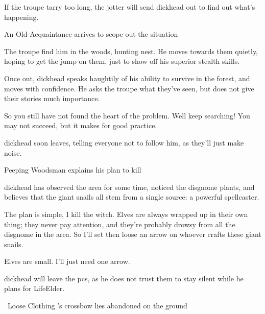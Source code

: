 
If the troupe tarry too long, the \gls{jotter} will send \gls{dickhead} out to find out what's happening.

{An Old Acquaintance}%
{ arrives to scope out the situation}%

The troupe find him in the woods, hunting  nest.
He moves towards them quietly, hoping to get the jump on them, just to show off his superior stealth \glspl{skill}.

Once out, \gls{dickhead} speaks haughtily of his ability to survive in the forest, and moves with confidence.
He asks the troupe what they've seen, but does not give their stories much importance.

\begin{speechtext}
  So you still have not found the heart of the problem.
  Well keep searching!
  You may not succeed, but it makes for good practice.
\end{speechtext}

\Gls{dickhead} soon leaves, telling everyone not to follow him, as they'll just make noise.

\dickhead

{Peeping Woodsman}%
{ explains his plan to kill }%

\Gls{dickhead} has observed the area for some time, noticed the \gls{disgnome} plants, and believes that the giant snails all stem from a single source: a powerful spellcaster.

\begin{speechtext}
  The plan is simple, I kill the \gls{witch}.
  Elves are always wrapped up in their own thing; they never pay attention, and they're probably drowsy from all the \gls{disgnome} in the area.
  So I'll set  then loose an arrow on whoever crafts these giant snails.

  Elves are small.
  I'll just need one arrow.
\end{speechtext}

\Gls{dickhead} will leave the \glspl{pc}, as he does not trust them to stay silent while he plans  for \gls{LifeElder}.

{\squash~Loose Clothing}%
{'s crossbow lies abandoned on the ground}%

